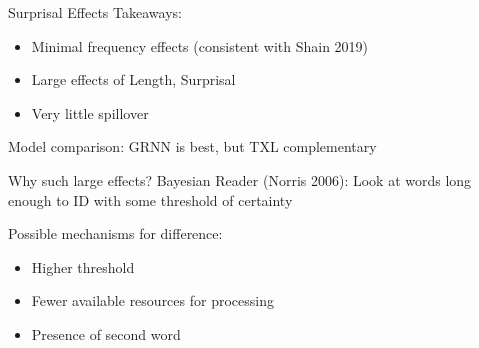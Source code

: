 \documentclass[12pt, xcolor=beamer,table,usenames,dvipsnames, ignorenonframetext, ngerman,t]{beamer}
\begin{document}
\begin{frame}{Surprisal Effects}
	Takeaways: \pause
	\begin{itemize}
		\item Minimal frequency effects (consistent with Shain 2019) \pause
		\item Large effects of Length, Surprisal \pause
		\item Very little spillover \pause
	\end{itemize}
%	
	Model comparison: GRNN is best, but TXL complementary
\end{frame}

\begin{frame}{Why such large effects?}
	\pause
	Bayesian Reader (Norris 2006): Look at words long enough to ID with some threshold of certainty \pause
	
Possible mechanisms for difference: \pause
\begin{itemize}
	\item Higher threshold \pause 
	\item Fewer available resources for processing \pause
	\item Presence of second word 
\end{itemize}

\end{frame}
\end{document}
